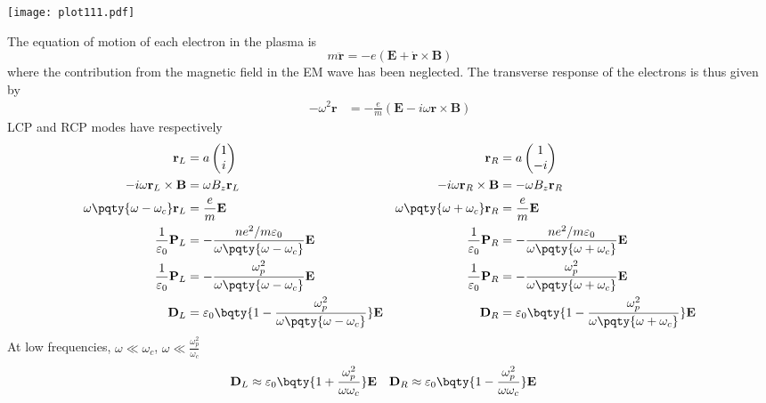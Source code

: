 \documentclass[12pt]{extarticle}
\renewcommand{\bf}{\mathbf}
\begin{document}
\begin{outline}[enumerate]
        \parbox{\linewidth}{\centering
            \captionsetup{type=figure,width =\linewidth}
            \texttt{[image: plot111.pdf]}
        }
        \1 The equation of motion of each electron in the plasma is \[
            m \bf{\ddot{r}} = - e(\bf E + \bf{\dot{r}} \times \bf B)
        \]
        where the contribution from the magnetic field in the EM wave has been neglected. The transverse response of the electrons is thus given by \begin{align*}
            - \omega^2\bf r &=- \frac{e}{m}(\bf E - i\omega \bf{r}\times\bf B ) 
        \end{align*}
        LCP and RCP modes have respectively \begin{align*}
            \bf r_L &=  a \begin{pmatrix} 1\\i \end{pmatrix} &\bf r_R &=  a \begin{pmatrix} 1\\-i \end{pmatrix} \\
            -i\omega {\bf r}_L \times \bf B &= \omega  B_z \bf r_L  &-i\omega {\bf r}_R \times \bf B &= - \omega  B_z \bf r_R\\
            \omega \pqty{\omega - \omega_c}\bf r_L &= \frac{e}{m}\bf E &  \omega \pqty{\omega + \omega_c}\bf r_R &= \frac{e}{m}\bf E\\
            \frac{1}{\varepsilon_0}\bf P_L &= -\frac{ne^2 /m \varepsilon_0}{\omega \pqty{\omega - \omega_c}}\bf E &\, \frac{1}{\varepsilon_0}\bf P_R &= -\frac{ne^2 /m\varepsilon_0}{\omega \pqty{\omega + \omega_c}} \bf E\\
            \frac{1}{\varepsilon_0}\bf P_L &= -\frac{\omega_p^2}{\omega \pqty{\omega - \omega_c}}\bf E &\frac{1}{\varepsilon_0}\bf P_R &= -\frac{\omega_p^2}{\omega \pqty{\omega + \omega_c}} \bf E\\
            \bf D_L &= \varepsilon_0\bqty{1-\frac{\omega_p^2}{\omega \pqty{\omega - \omega_c}}}\bf E &\bf D_R &= \varepsilon_0 \bqty{1-\frac{\omega_p^2}{\omega \pqty{\omega + \omega_c}}} \bf E
        \end{align*}
        At low frequencies, \(\omega \ll \omega_c\), \(\omega \ll \frac{\omega^2_p}{\omega_c}\) \begin{align*}
            \bf D_L & \approx  \varepsilon_0\bqty{1 + \frac{\omega_p^2}{\omega \omega_c}}\bf E &\bf D_R & \approx  \varepsilon_0 \bqty{1 -\frac{\omega_p^2}{\omega {\omega_c}}} \bf E

\end{align*}
\end{outline}
\end{document}
